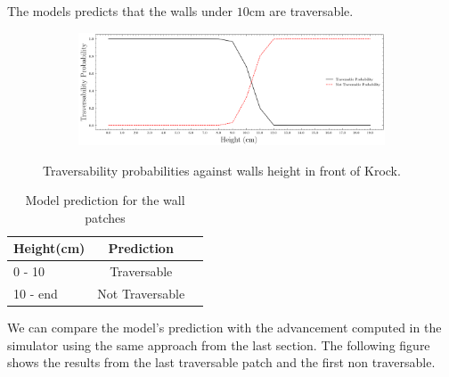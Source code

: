 The models predicts that the walls under $10$cm are traversable.
\begin{figure}[H]
    \centering
\begin{subfigure}[b]{1\textwidth}
    \includegraphics[width=\linewidth]{../img/5/custom_patches/walls_increasing/predictions.png}
    \end{subfigure}
    \caption{Traversability probabilities against walls height in front of Krock.}
\end{figure}

\begin{table}[H]
    \centering
    \begin{tabular}{l|cc}
        Height(cm) & Prediction \\ 
        \hline
        0 - 10  & Traversable \\ 
        10 - end & Not Traversable \\ 
        \hline
    \end{tabular}
    \caption{Model prediction for the wall patches}
\end{table}
We can compare the model's prediction with the advancement computed in the simulator using the same approach from the last section. The following figure shows the results from the last traversable patch and the first non traversable.

